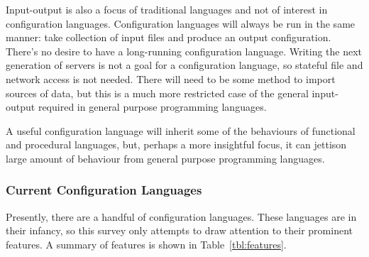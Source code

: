 \documentclass[letterpaper,twocolumn,10pt]{article}
\begin{document}
Input-output is also a focus of traditional languages and not of interest in configuration languages. Configuration languages will always be run in the same manner: take collection of input files and produce an output configuration. There's no desire to have a long-running configuration language. Writing the next generation of servers is not a goal for a configuration language, so stateful file and network access is not needed. There will need to be some method to import sources of data, but this is a much more restricted case of the general input-output required in general purpose programming languages. 

A useful configuration language will inherit some of the behaviours of functional and procedural languages, but, perhaps a more insightful focus, it can jettison large amount of behaviour from general purpose programming languages.

\subsubsection{Current Configuration Languages}
Presently, there are a handful of configuration languages. These languages are in their infancy, so this survey only attempts to draw attention to their prominent features. A summary of features is shown in Table~\ref{tbl:features}.
\end{document}
